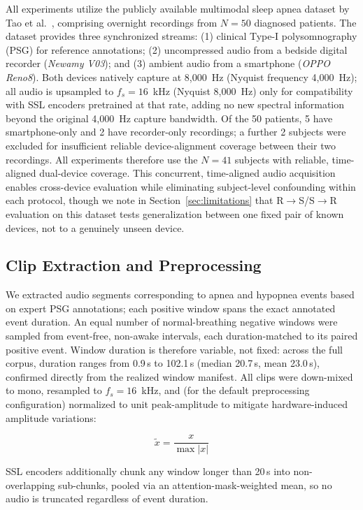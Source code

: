 \documentclass[conference]{IEEEtran}
\begin{document}
All experiments utilize the publicly available multimodal sleep apnea dataset by Tao et al.~\cite{tao2025}, comprising overnight recordings from $N = 50$ diagnosed patients. The dataset provides three synchronized streams: (1) clinical Type-I polysomnography (PSG) for reference annotations; (2) uncompressed audio from a bedside digital recorder (\emph{Newamy V03}); and (3) ambient audio from a smartphone (\emph{OPPO Reno8}). Both devices natively capture at 8,000~Hz (Nyquist frequency 4,000~Hz); all audio is upsampled to $f_s=16$~kHz (Nyquist 8,000~Hz) only for compatibility with SSL encoders pretrained at that rate, adding no new spectral information beyond the original 4,000~Hz capture bandwidth. Of the 50 patients, 5 have smartphone-only and 2 have recorder-only recordings; a further 2 subjects were excluded for insufficient reliable device-alignment coverage between their two recordings. All experiments therefore use the $N=41$ subjects with reliable, time-aligned dual-device coverage. This concurrent, time-aligned audio acquisition enables cross-device evaluation while eliminating subject-level confounding within each protocol, though we note in Section~\ref{sec:limitations} that R$\rightarrow$S/S$\rightarrow$R evaluation on this dataset tests generalization between one fixed pair of known devices, not to a genuinely unseen device.

\subsection{Clip Extraction and Preprocessing}

We extracted audio segments corresponding to apnea and hypopnea events based on expert PSG annotations; each positive window spans the exact annotated event duration. An equal number of normal-breathing negative windows were sampled from event-free, non-awake intervals, each duration-matched to its paired positive event. Window duration is therefore variable, not fixed: across the full corpus, duration ranges from 0.9\,s to 102.1\,s (median 20.7\,s, mean 23.0\,s), confirmed directly from the realized window manifest. All clips were down-mixed to mono, resampled to $f_s = 16$~kHz, and (for the default preprocessing configuration) normalized to unit peak-amplitude to mitigate hardware-induced amplitude variations:

\begin{equation}
\tilde{x}=\frac{x}{\max |x|}
\end{equation}

SSL encoders additionally chunk any window longer than 20\,s into non-overlapping sub-chunks, pooled via an attention-mask-weighted mean, so no audio is truncated regardless of event duration.
\end{document}
